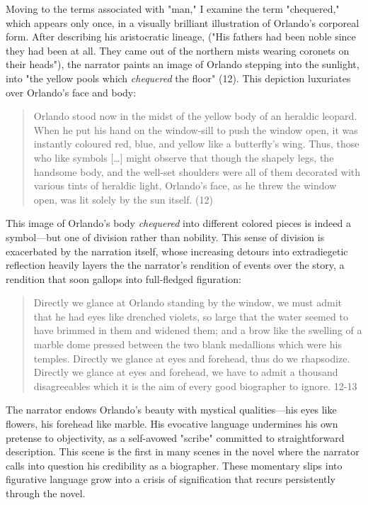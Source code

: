 \documentclass[11pt]{article}
\begin{document}
Moving to the terms associated with "man," I examine the term
"chequered," which appears only once, in a visually brilliant
illustration of Orlando's corporeal form. After describing his
aristocratic lineage, ("His fathers had been noble since they had been
at all. They came out of the northern mists wearing coronets on their
heads"), the narrator paints an image of Orlando stepping into the
sunlight, into "the yellow pools which \emph{chequered} the floor" (12).
This depiction luxuriates over Orlando's face and body:
\begin{quote}
Orlando stood now in the midst of the yellow body of an heraldic
leopard. When he put his hand on the window-sill to push the window
open, it was instantly coloured red, blue, and yellow like a
butterfly's wing. Thus, those who like symbols [\ldots{}] might observe
that though the shapely legs, the handsome body, and the well-set
shoulders were all of them decorated with various tints of heraldic
light, Orlando's face, as he threw the window open, was lit solely by
the sun itself. (12)
\end{quote}
This image of Orlando's body \emph{chequered} into different colored pieces
is indeed a symbol---but one of division rather than nobility. This
sense of division is exacerbated by the narration itself, whose
increasing detours into extradiegetic reflection heavily layers the
the narrator's rendition of events over the story, a rendition that
soon gallops into full-fledged figuration:
\begin{quote}
Directly we glance at Orlando standing by the window, we must admit
that he had eyes like drenched violets, so large that the water seemed
to have brimmed in them and widened them; and a brow like the swelling
of a marble dome pressed between the two blank medallions which were
his temples. Directly we glance at eyes and forehead, thus do we
rhapsodize. Directly we glance at eyes and forehead, we have to admit
a thousand disagreeables which it is the aim of every good biographer
to ignore. 12-13
\end{quote}
The narrator endows Orlando's beauty with mystical qualities---his
eyes like flowers, his forehead like marble. His evocative language
undermines his own pretense to objectivity, as a self-avowed "scribe"
committed to straightforward description. This scene is the first in
many scenes in the novel where the narrator calls into question his
credibility as a biographer. These momentary slips into figurative
language grow into a crisis of signification that recurs persistently
through the novel.
\end{document}
